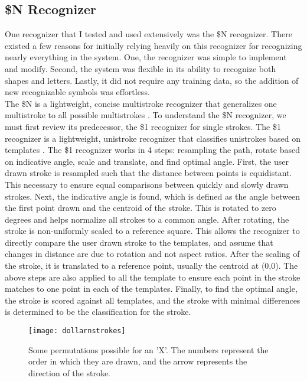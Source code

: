 \subsection{\$N Recognizer}
One recognizer that I tested and used extensively was the \$N recognizer. There existed a few reasons for initially relying heavily on this recognizer for recognizing nearly everything in the system. One, the recognizer was simple to implement and modify. Second, the system was flexible in its ability to recognize both shapes and letters. Lastly, it did not require any training data, so the addition of new recognizable symbols was effortless. \\

The \$N is a lightweight, concise multistroke recognizer that generalizes one multistroke to all possible multistrokes \cite{dollarN}. To understand the \$N recognizer, we must first review its predecessor, the \$1 recognizer for single strokes. The \$1 recognizer is a lightweight, unistroke recognizer that classifies unistrokes based on templates \cite{onedollar}. The \$1 recognizer works in 4 steps: resampling the path, rotate based on indicative angle, scale and translate, and find optimal angle. First, the user drawn stroke is resampled such that the distance between points is equidistant. This necessary to ensure equal comparisons between quickly and slowly drawn strokes. Next, the indicative angle is found, which is defined as the angle between the first point drawn and the centroid of the stroke. This is rotated to zero degrees and helps normalize all strokes to a common angle. After rotating, the stroke is non-uniformly scaled to a reference square. This allows the recognizer to directly compare the user drawn stroke to the templates, and assume that changes in distance are due to rotation and not aspect ratios. After the scaling of the stroke, it is translated to a reference point, usually the centroid at (0,0). The above steps are also applied to all the template to ensure each point in the stroke matches to one point in each of the templates. Finally, to find the optimal angle, the stroke is scored against all templates, and the stroke with minimal differences is determined to be the classification for the stroke. \\

\begin{figure}[ht]
\centering
\texttt{[image: dollarnstrokes]}
\caption[Examples of stroke permutations]{Some permutations possible for an 'X'. The numbers represent the order in which they are drawn, and the arrow represents the direction of the stroke.}
\label{fig:nstrokes}
\end{figure}

